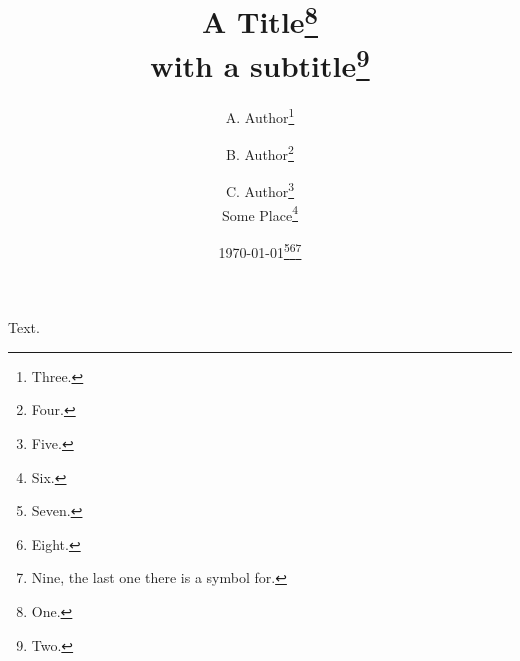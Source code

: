 \documentclass[12pt]{article}
\title{A Title\thanks{One.}\\\normalsize with a subtitle\thanks{Two.}}
\author{A. Author\thanks{Three.} \and B. Author\thanks{Four.} \and C. Author\thanks{Five.}\\ Some Place\thanks{Six.}}
\date{\today\thanks{Seven.}\thanks{Eight.}\thanks{Nine, the last one there is a symbol for.}}
\begin{document}
\maketitle
Text.
\end{document}
